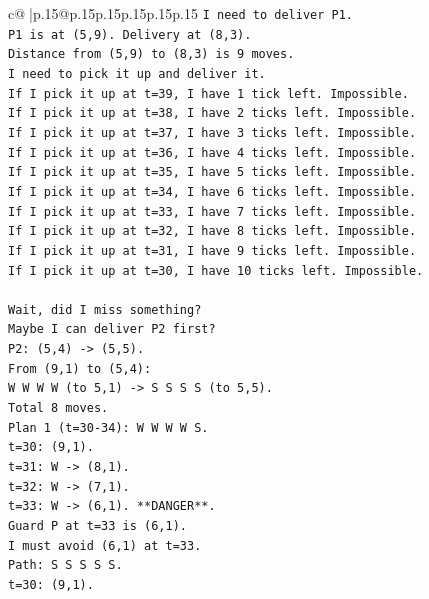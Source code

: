 \documentclass{article}
\begin{document}
{\begin{supertabular}{c@{$\;$}|p{.15\linewidth}@{}p{.15\linewidth}p{.15\linewidth}p{.15\linewidth}p{.15\linewidth}p{.15\linewidth}}
{{{\texttt{I need to deliver P1.} \\
\texttt{P1 is at (5,9). Delivery at (8,3).} \\
\texttt{Distance from (5,9) to (8,3) is 9 moves.} \\
\texttt{I need to pick it up and deliver it.} \\
\texttt{If I pick it up at t=39, I have 1 tick left. Impossible.} \\
\texttt{If I pick it up at t=38, I have 2 ticks left. Impossible.} \\
\texttt{If I pick it up at t=37, I have 3 ticks left. Impossible.} \\
\texttt{If I pick it up at t=36, I have 4 ticks left. Impossible.} \\
\texttt{If I pick it up at t=35, I have 5 ticks left. Impossible.} \\
\texttt{If I pick it up at t=34, I have 6 ticks left. Impossible.} \\
\texttt{If I pick it up at t=33, I have 7 ticks left. Impossible.} \\
\texttt{If I pick it up at t=32, I have 8 ticks left. Impossible.} \\
\texttt{If I pick it up at t=31, I have 9 ticks left. Impossible.} \\
\texttt{If I pick it up at t=30, I have 10 ticks left. Impossible.} \\
\\ 
\texttt{Wait, did I miss something?} \\
\texttt{Maybe I can deliver P2 first?} \\
\texttt{P2: (5,4) {-}> (5,5).} \\
\texttt{From (9,1) to (5,4):} \\
\texttt{W W W W (to 5,1) {-}> S S S S (to 5,5).} \\
\texttt{Total 8 moves.} \\
\texttt{Plan 1 (t=30{-}34): W W W W S.} \\
\texttt{t=30: (9,1).} \\
\texttt{t=31: W {-}> (8,1).} \\
\texttt{t=32: W {-}> (7,1).} \\
\texttt{t=33: W {-}> (6,1). **DANGER**.} \\
\texttt{Guard P at t=33 is (6,1).} \\
\texttt{I must avoid (6,1) at t=33.} \\
\texttt{Path: S S S S S.} \\
\texttt{t=30: (9,1).} \\
}}}
\end{supertabular}}
\end{document}
